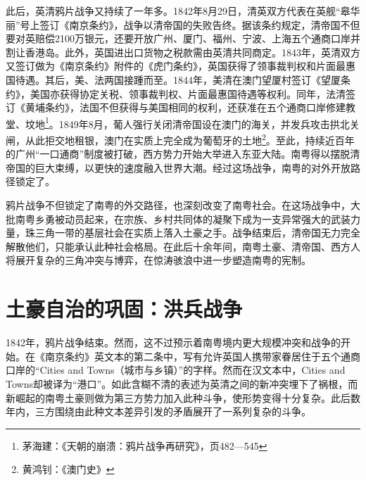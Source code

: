 此后，英清鸦片战争又持续了一年多。1842年8月29日，清英双方代表在英舰“皋华丽”号上签订《南京条约》，战争以清帝国的失败告终。据该条约规定，清帝国不但要对英赔偿2100万银元，还要开放广州、厦门、福州、宁波、上海五个通商口岸并割让香港岛。此外，英国进出口货物之税款需由英清共同商定。1843年，英清双方又签订做为《南京条约》附件的《虎门条约》，英国获得了领事裁判权和片面最惠国待遇。其后，美、法两国接踵而至。1844年，美清在澳门望厦村签订《望厦条约》，美国亦获得协定关税、领事裁判权、片面最惠国待遇等权利。同年，法清签订《黄埔条约》，法国不但获得与美国相同的权利，还获准在五个通商口岸修建教堂、坟地\footnote{茅海建：《天朝的崩溃：鸦片战争再研究》，页482—545}。1849年8月，葡人强行关闭清帝国设在澳门的海关，并发兵攻击拱北关闸，从此拒交地租银，澳门在实质上完全成为葡萄牙的土地\footnote{黄鸿钊：《澳门史》}。至此，持续近百年的广州“一口通商”制度被打破，西方势力开始大举进入东亚大陆。南粤得以摆脱清帝国的巨大束缚，以更快的速度融入世界大潮。经过这场战争，南粤的对外开放路径锁定了。

鸦片战争不但锁定了南粤的外交路径，也深刻改变了南粤社会。在这场战争中，大批南粤乡勇被动员起来，在宗族、乡村共同体的凝聚下成为一支异常强大的武装力量，珠三角一带的基层社会在实质上落入土豪之手。战争结束后，清帝国无力完全解散他们，只能承认此种社会格局。在此后十余年间，南粤土豪、清帝国、西方人将展开复杂的三角冲突与博弈，在惊涛骇浪中进一步塑造南粤的宪制。

\section{土豪自治的巩固：洪兵战争}

1842年，鸦片战争结束。然而，这不过预示着南粤境内更大规模冲突和战争的开始。在《南京条约》英文本的第二条中，写有允许英国人携带家眷居住于五个通商口岸的“Cities and Towns（城市与乡镇）”的字样。然而在汉文本中，Cities and Towns却被译为“港口”。如此含糊不清的表述为英清之间的新冲突埋下了祸根，而新崛起的南粤土豪则做为第三方势力加入此种斗争，使形势变得十分复杂。此后数年内，三方围绕由此种文本差异引发的矛盾展开了一系列复杂的斗争。

